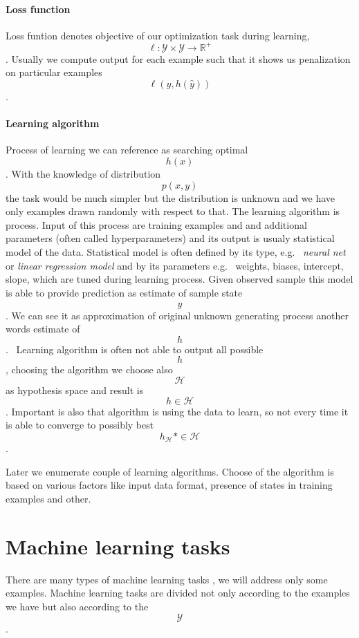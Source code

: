 \paragraph{Loss function}
Loss funtion denotes objective of our optimization task during learning, $$\ell: \mathcal{Y} \times \mathcal{Y} \rightarrow \mathbb{R}^{+}$$. Usually we compute output for each example such that it shows us penalization on particular examples $$\ell(y, h(\hat{y}))$$.

\paragraph{Learning algorithm}
Process of learning we can reference as searching optimal $$h(x)$$. With the knowledge of distribution $$p(x,y)$$ the task would be much simpler but the distribution is unknown and we have only examples drawn randomly with respect to that. The learning algorithm is process. Input of this process are training examples and and additional parameters (often called hyperparameters) and its output is usualy statistical model of the data. Statistical model is often defined by its type, e.g. \ \emph{neural net} or \emph{linear regression model} and by its parameters e.g. \ weights, biases, intercept, slope, which are tuned during learning process. Given observed sample this model is able to provide prediction as estimate of sample state $$\hat{y}$$. We can see it as approximation of original unknown generating process another words estimate of $$h$$. \
Learning algorithm is often not able to output all possible $$h$$, choosing the algorithm we choose also $$\mathcal{H}$$ as hypothesis space and result is $$h \in \mathcal{H}$$. Important is also that algorithm is using the data to learn, so not every time it is able to converge to possibly best $$h_{\mathcal{H}}* \in \mathcal{H}$$.

Later we enumerate couple of learning algorithms. Choose of the algorithm is based on various factors like input data format, presence of states in training examples and other.



\section{Machine learning tasks}
There are many types of machine learning tasks \citet{GoodBengCour16}, we will address only some examples. Machine learning tasks are divided not only according to the examples we have but also according to the $$\mathcal{Y}$$.


